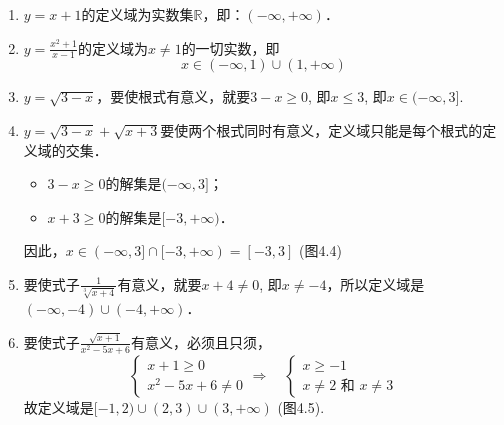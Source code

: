 \begin{solution} 
\begin{enumerate}
    \item $y=x+1$的定义域为实数集$\mathbb{R}$，即：$(-\infty,+\infty)$．
    \item $y=\frac{x^2+1}{x-1}$的定义域为$x\ne 1$的一切实数，即
    \[x\in (-\infty,1)\cup(1,+\infty)\]
\item $y=\sqrt{3-x}$，要使根式有意义，就要$3-x\ge 0$,
即$x\le 3$, 即$x\in (-\infty,3]$.
\item $y=\sqrt{3-x}+\sqrt{x+3}$要使两个根式同时有意义，定义域只能是每个根式的定
义域的交集．
\begin{itemize}
    \item $3-x\ge 0$的解集是$(-\infty,3]$；
    \item  $x+3\ge 0$的解集是$[-3,+\infty)$．
\end{itemize}
因此，$x\in (-\infty,3]\cap [-3,+\infty)=[-3,3]$ (图4.4)
\begin{figure}[htp]
    \centering
{}
    \caption{}
\end{figure}
\item 要使式子$\frac{1}{\sqrt[3]{x+4}}$有意义，就要$x+4\ne 0$, 即$x\ne -4$，所以定义域是$(-\infty,-4)\cup(-4,+\infty)$．
\item 要使式子$\frac{\sqrt{x+1}}{x^2-5x+6}$有意义，必须且只须，
\[\begin{cases}
    x+1\ge 0\\
x^2-5x+6\ne 0
\end{cases}\Rightarrow\quad \begin{cases}
   x\ge -1\\
   x\ne 2\text{ 和 }x\ne 3
\end{cases}\]
故定义域是$[-1,2)\cup(2,3)\cup(3,+\infty)$ (图4.5).

\begin{figure}[htp]
    \centering
    \caption{}
\end{figure}


\end{enumerate}
\end{solution}
